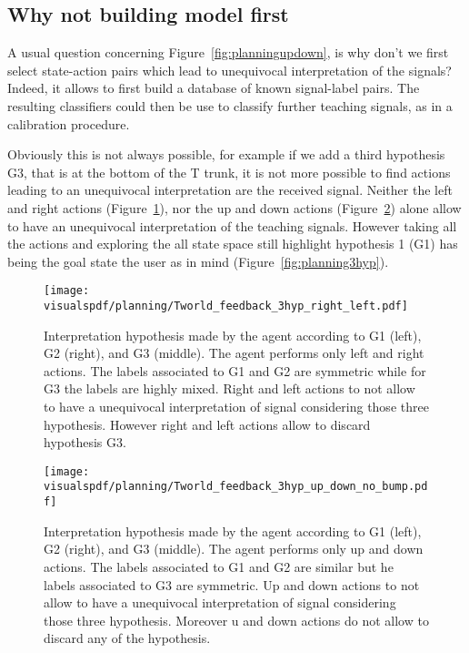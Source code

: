 \subsection{Why not building model first}

A usual question concerning Figure~\ref{fig:planningupdown}, is why don't we first select state-action pairs which lead to unequivocal interpretation of the signals? Indeed, it allows  to first build a database of known signal-label pairs. The resulting classifiers could then be use to classify further teaching signals, as in a calibration procedure.

Obviously this is not always possible, for example if we add a third hypothesis G3, that is at the bottom of the T trunk, it is not more possible to find actions leading to an unequivocal interpretation are the received signal. Neither the left and right actions (Figure~\ref{fig:planning3hyprightleft}), nor the up and down actions (Figure~\ref{fig:planning3hypupdown}) alone allow to have an unequivocal interpretation of the teaching signals. However taking all the actions and exploring the all state space still highlight hypothesis 1 (G1) has being the goal state the user as in mind (Figure~\ref{fig:planning3hyp}).

\begin{figure}[!htbp]
  \centering
  \texttt{[image: \\visualspdf/planning/Tworld\_feedback\_3hyp\_right\_left.pdf]}
  \caption{Interpretation hypothesis made by the agent according to G1 (left), G2 (right), and G3 (middle). The agent performs only left and right actions. The labels associated to G1 and G2 are symmetric while for G3 the labels are highly mixed. Right and left actions to not allow to have a unequivocal interpretation of signal considering those three hypothesis. However right and left actions allow to discard hypothesis G3.}
  \label{fig:planning3hyprightleft}
\end{figure}

\begin{figure}[!htbp]
  \centering
  \texttt{[image: \\visualspdf/planning/Tworld\_feedback\_3hyp\_up\_down\_no\_bump.pdf]}
  \caption{Interpretation hypothesis made by the agent according to G1 (left), G2 (right), and G3 (middle). The agent performs only up and down actions. The labels associated to G1 and G2 are similar but he labels associated to G3 are symmetric. Up and down actions to not allow to have a unequivocal interpretation of signal considering those three hypothesis. Moreover u and down actions do not allow to discard any of the hypothesis.}
  \label{fig:planning3hypupdown}
\end{figure}

